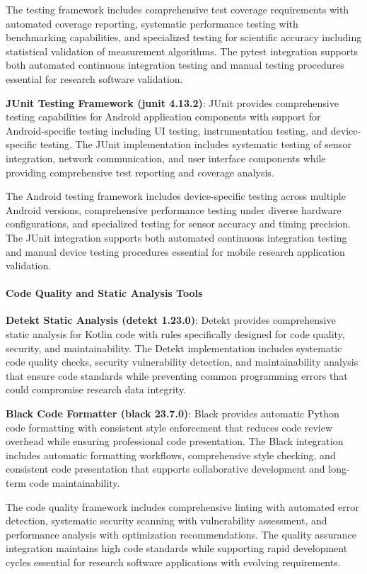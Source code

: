 \documentclass[11pt,a4paper]{report}
\begin{document}
The testing framework includes comprehensive test coverage requirements with automated coverage reporting, systematic
performance testing with benchmarking capabilities, and specialized testing for scientific accuracy including
statistical validation of measurement algorithms. The pytest integration supports both automated continuous integration
testing and manual testing procedures essential for research software validation.

\textbf{JUnit Testing Framework (junit 4.13.2)}: JUnit provides comprehensive testing capabilities for Android application
components with support for Android-specific testing including UI testing, instrumentation testing, and device-specific
testing. The JUnit implementation includes systematic testing of sensor integration, network communication, and user
interface components while providing comprehensive test reporting and coverage analysis.

The Android testing framework includes device-specific testing across multiple Android versions, comprehensive
performance testing under diverse hardware configurations, and specialized testing for sensor accuracy and timing
precision. The JUnit integration supports both automated continuous integration testing and manual device testing
procedures essential for mobile research application validation.

\paragraph{Code Quality and Static Analysis Tools}

\textbf{Detekt Static Analysis (detekt 1.23.0)}: Detekt provides comprehensive static analysis for Kotlin code with rules
specifically designed for code quality, security, and maintainability. The Detekt implementation includes systematic
code quality checks, security vulnerability detection, and maintainability analysis that ensure code standards while
preventing common programming errors that could compromise research data integrity.

\textbf{Black Code Formatter (black 23.7.0)}: Black provides automatic Python code formatting with consistent style
enforcement that reduces code review overhead while ensuring professional code presentation. The Black integration
includes automatic formatting workflows, comprehensive style checking, and consistent code presentation that supports
collaborative development and long-term code maintainability.

The code quality framework includes comprehensive linting with automated error detection, systematic security scanning
with vulnerability assessment, and performance analysis with optimization recommendations. The quality assurance
integration maintains high code standards while supporting rapid development cycles essential for research software
applications with evolving requirements.
\end{document}
